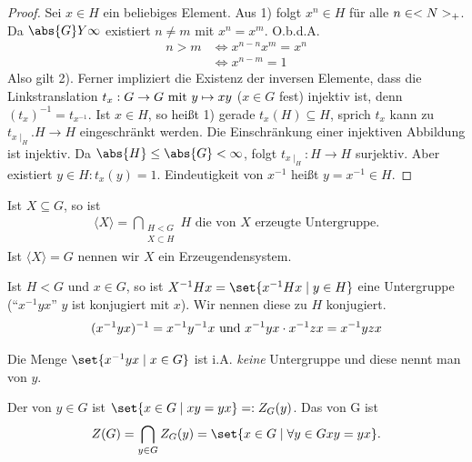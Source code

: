 \begin{proof}
	Sei $x \in H$ ein beliebiges Element. Aus 1) folgt $x^n \in H$ für alle $n \in \N_{+}$. Da $\abs{G}Y \infty$ existiert $n\neq m$ mit $x^n = x^m$. O.b.d.A.
	\begin{align*}
		 n > m &\Longleftrightarrow x^{n-n} x^m = x^n\\
		 &\Longleftrightarrow x^{n-m} = 1
	\end{align*}
	Also gilt 2). Ferner impliziert die Existenz der inversen Elemente, dass die Linkstranslation $t_x: G \to G \mit y \mapsto xy$ ($x \in G$ fest) injektiv ist, denn $(t_x)^{-1} = t_{x^{-1}}$. Ist $x \in H$, so heißt 1) gerade $t_x(H) \subseteq H$, sprich $t_x$ kann zu $t_{x\mid_H}. H \to H$ eingeschränkt werden. Die Einschränkung einer injektiven Abbildung ist injektiv. Da $\abs{H} \le \abs{G} < \infty$, folgt $t_{x\mid_H}: H \to H$ surjektiv. Aber existiert $y \in H: t_x(y)= 1$. Eindeutigkeit von $x^{-1}$ heißt $y = x^{-1} \in H$.
\end{proof}
\begin{definition}[Erzeugendensystem]
	Ist $X \subseteq G$, so ist
	\begin{align*}
		\langle X \rangle = \bigcap_{\substack{H < G\\X \subset H}} H \text{ die von $X$ erzeugte Untergruppe}.
	\end{align*}
	Ist $\langle X \rangle = G$ nennen wir $X$ ein Erzeugendensystem.
\end{definition}
\begin{definition}[Konjugation]
	Ist $H < G$ und $x \in G$, so ist $X^{-1}Hx = \set{x^{-1}Hx\mid y \in H}$ eine Untergruppe (``$x^{-1}yx$'' $y$ ist konjugiert mit $x$). Wir nennen diese zu $H$ konjugiert.
	\begin{align*}
		(x^{-1}yx)^{-1} = x^{-1}y^{-1}x \und x^{-1}yx\cdot x^{-1}zx = x^{-1}yzx
	\end{align*}
\end{definition}
\begin{definition}[Konjugationsklasse]
	Die Menge $\set{x^{-1}yx \mid x \in G}$ ist i.A. \emph{keine} Untergruppe und diese nennt man  von $y$.
\end{definition}
\begin{definition}
	Der  von $y \in G$ ist $\set{x \in G \mid xy = yx} =: Z_G(y)$. Das  von G ist
	\begin{align*}
		Z(G) = \bigcap_{y \in G} Z_G(y) = \set{x \in G \mid \forall y \in G xy=yx}.
	\end{align*}
\end{definition}
